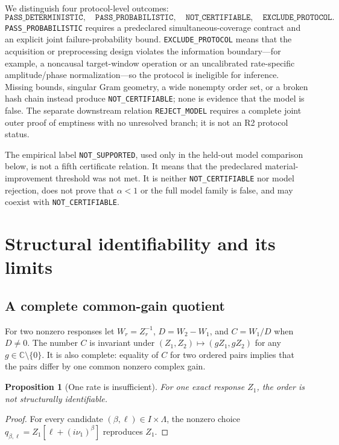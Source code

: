 \documentclass[11pt]{article}
\newtheorem{proposition}[theorem]{Proposition}
\theoremstyle{definition}
\theoremstyle{remark}
\newcommand{\C}{\mathbb C}
\newcommand{\status}[1]{\texttt{#1}}
\begin{document}
We distinguish four protocol-level outcomes:
\[
 \status{PASS\_DETERMINISTIC},\quad
 \status{PASS\_PROBABILISTIC},\quad
 \status{NOT\_CERTIFIABLE},\quad
 \status{EXCLUDE\_PROTOCOL}.
\]
\status{PASS\_PROBABILISTIC} requires a predeclared simultaneous-coverage
contract and an explicit joint failure-probability bound.
\status{EXCLUDE\_PROTOCOL} means that the acquisition or preprocessing design
violates the information boundary---for example, a noncausal target-window
operation or an uncalibrated rate-specific amplitude/phase normalization---so
the protocol is ineligible for inference.  Missing bounds, singular Gram
geometry, a wide nonempty order set, or a broken hash chain instead produce
\status{NOT\_CERTIFIABLE}; none is evidence that the model is false.  The
separate downstream relation \status{REJECT\_MODEL} requires a complete joint
outer proof of emptiness with no unresolved branch; it is not an R2 protocol
status.

The empirical label \status{NOT\_SUPPORTED}, used only in the held-out model
comparison below, is not a fifth certificate relation.  It means that the
predeclared material-improvement threshold was not met.  It is neither
\status{NOT\_CERTIFIABLE} nor model rejection, does not prove that
$\alpha<1$ or the full model family is false, and may coexist with
\status{NOT\_CERTIFIABLE}.

\section{Structural identifiability and its limits}

\subsection{A complete common-gain quotient}

For two nonzero responses let $W_r=Z_r^{-1}$,
$D=W_2-W_1$, and $C=W_1/D$ when $D\ne0$.  The number $C$ is invariant under
$(Z_1,Z_2)\mapsto(gZ_1,gZ_2)$ for any $g\in\C\setminus\{0\}$.  It is also
complete: equality of $C$ for two ordered pairs implies that the pairs differ
by one common nonzero complex gain.

\begin{proposition}[One rate is insufficient]
For one exact response $Z_1$, the order is not structurally identifiable.
\end{proposition}
\begin{proof}
For every candidate $(\beta,\ell)\in I\times\Lambda$, the nonzero choice
$q_{\beta,\ell}=Z_1[\ell+(i\nu_1)^\beta]$ reproduces $Z_1$.
\end{proof}
\end{document}

